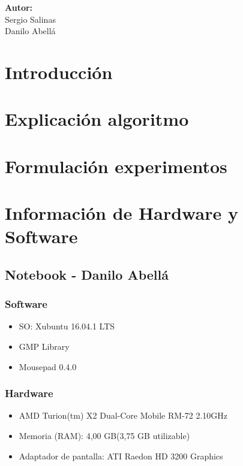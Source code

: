 \documentclass[12pt,letterpaper]{scrartcl}
\begin{document}
\begin{titlepage}
\begin{center}
\begin{minipage}[l]{0.4\textwidth}
	\begin{flushright}

		\textbf{\textsf{Autor:}}\\
		\linespread{1}
		\large Sergio Salinas\\
		\large Danilo Abellá\\

	\end{flushright}
\end{minipage}

\end{center}

\end{titlepage}



\newpage
\section*{Introducción}

\section{Explicación algoritmo}

\section{Formulación experimentos}

\section{Información de Hardware y Software}


\subsection{ Notebook - Danilo Abellá}
\subsubsection{Software}
\begin{itemize}
\item SO: Xubuntu 16.04.1 LTS
\item GMP Library
\item Mousepad 0.4.0
\end{itemize}

\subsubsection{Hardware}
\begin{itemize}
\item AMD Turion(tm) X2 Dual-Core Mobile RM-72 2.10GHz
\item Memoria (RAM): 4,00 GB(3,75 GB utilizable)
\item Adaptador de pantalla: ATI Raedon HD 3200 Graphics
\end{itemize}
\end{document}
